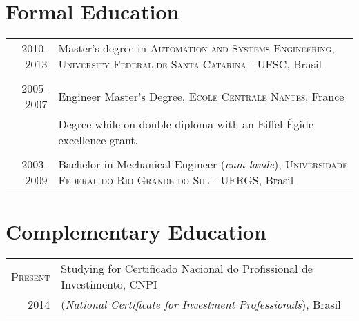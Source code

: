 \documentclass[a4paper,10pt]{article} %
\begin{document}

\section{Formal Education}
\begin{tabular}{rp{11cm}}	
\textsc{2010-2013} & Master's degree in \textsc{Automation and Systems
  Engineering}, \textsc{University Federal de Santa Catarina} - UFSC,
Brasil\\

&\\


\textsc{2005-2007} & Engineer Master's Degree, \textsc{Ecole Centrale Nantes}, France\\
& Degree while on double diploma with an Eiffel-Égide excellence grant.\\
&\\


\textsc{2003-2009} & Bachelor in Mechanical Engineer (\textit{cum laude}),
\textsc{Universidade Federal do Rio Grande do Sul} - UFRGS, Brasil \\
 
\end{tabular}


\section{Complementary Education}
\begin{tabular}{rp{11cm}}	
\textsc{Present} & Studying for Certificado Nacional do Profissional
de Investimento, CNPI \\
2014 & (\textit{National Certificate for Investment Professionals}),
Brasil\\
 
\end{tabular}
\end{document}
